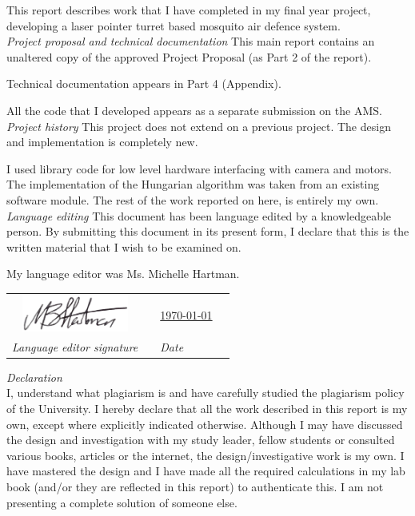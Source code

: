 
This report describes work that I have completed in my final year project, developing a laser pointer turret based mosquito air defence system.
\\[2ex]
\textit{Project proposal and technical documentation} \newline
This main report contains an unaltered copy of the approved Project Proposal (as Part 2 of the report).

Technical documentation appears in Part 4 (Appendix).

All the code that I developed appears as a separate submission on the AMS.
\\[2ex]
\textit{Project history} \newline
This project does not extend on a previous project. The design and implementation is completely new.

I used library code for low level hardware interfacing with camera and motors. The implementation of the Hungarian algorithm was taken from an existing software module. The rest of the work reported on here, is entirely my own.
\\[2ex]
\textit{Language editing} \newline
This document has been language edited by a knowledgeable person. By submitting this document in its present form, I declare that this is the written material that I wish to be examined on.

My language editor was Ms. Michelle Hartman.

\vspace*{0.5cm}

\begin{tabular}{cp{4cm}ll}
  \includegraphics[width=3.5cm]{figures/mich_handtekening.png} &  & \underline{\today} \\
  \textit{Language editor signature}                           &  & \textit{Date}
\end{tabular}

\vspace*{0.5cm}

\textit{Declaration}
\\[2ex]
I, \underline{\eprthecandidatename} understand what plagiarism is and have carefully studied the plagiarism policy of the University. I hereby declare that all the work described in this report is my own, except where explicitly indicated otherwise. Although I may have discussed the design and investigation with my study leader, fellow students or consulted various books, articles or the internet, the design/investigative work is my own. I have mastered the design and I have made all the required calculations in my lab book (and/or they are reflected in this report) to authenticate this. I am not presenting a complete solution of someone else.

